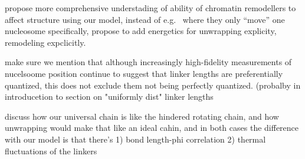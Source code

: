 \documentclass[%
 reprint,
superscriptaddress,
showpacs,preprintnumbers,
 amsmath,amssymb,
 aps,
 prl,
]{revtex4-1}
\begin{document}
propose more comprehensive understading of ability of chromatin
remodellers to affect structure using our model, instead of
e.g.~\cite{muller2014} where they only ``move'' one nucleosome
specifically, propose to add energetics for unwrapping explicity, remodeling
expclicitly.

make sure we mention that although increasingly high-fidelity measurements
of nucelsoome position continue to suggest that linker lengths are
preferentially quantized, this does not exclude them not being perfectly
quantized. (probalby in introducetion to section on "uniformly dist" linker
lengths

discuss how our universal chain is like the hindered rotating chain, and
how unwrapping would make that like an ideal cahin, and in both cases the
difference with our model is that there's 1) bond length-phi correlation 2)
thermal fluctuations of the linkers





\end{document}
